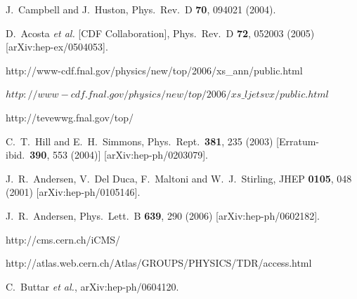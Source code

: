 \documentclass[12pt]{iopart}
\begin{document}
\begin{thebibliography}{99}
  J.~Campbell and J.~Huston,
  Phys.\ Rev.\ D {\bf 70}, 094021 (2004).







  D.~Acosta {\it et al.}  [CDF Collaboration],
  Phys.\ Rev.\ D {\bf 72}, 052003 (2005)
  [arXiv:hep-ex/0504053].

	http://www-cdf.fnal.gov/physics/new/top/2006/xs\_ann/public.html


 $http://www-cdf.fnal.gov/physics/new/top/2006/xs\_ljetsvx/public.html$

 http://tevewwg.fnal.gov/top/

  C.~T.~Hill and E.~H.~Simmons,
  Phys.\ Rept.\  {\bf 381}, 235 (2003)
  [Erratum-ibid.\  {\bf 390}, 553 (2004)]
  [arXiv:hep-ph/0203079].

  J.~R.~Andersen, V.~Del Duca, F.~Maltoni and W.~J.~Stirling,
  JHEP {\bf 0105}, 048 (2001)
  [arXiv:hep-ph/0105146].

  J.~R.~Andersen,
  Phys.\ Lett.\ B {\bf 639}, 290 (2006)
  [arXiv:hep-ph/0602182].

 http://cms.cern.ch/iCMS/

 http://atlas.web.cern.ch/Atlas/GROUPS/PHYSICS/TDR/access.html

  C.~Buttar {\it et al.},
  arXiv:hep-ph/0604120.



\end{thebibliography}
\end{document}

